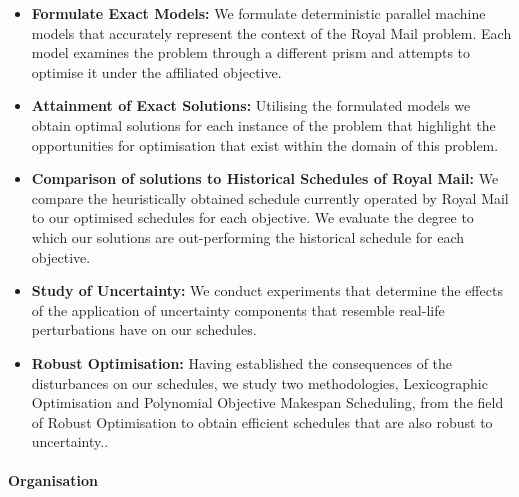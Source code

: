 \vspace{\baselineskip}
\begin{itemize}

	\item \textbf{Formulate Exact Models:} We formulate deterministic parallel machine models that accurately represent the context of the Royal Mail problem. Each model examines the problem through a different prism and attempts to optimise it under the affiliated objective.  \par

	\item \textbf{Attainment of Exact Solutions:} Utilising the formulated models we obtain optimal solutions for each instance of the problem that highlight the opportunities for optimisation that exist within the domain of this problem.   \par
	
	\item \textbf{Comparison of solutions to Historical Schedules of Royal Mail: }We compare the heuristically obtained schedule currently operated by Royal Mail to our optimised schedules for each objective. We evaluate the degree to which our solutions are out-performing the historical schedule for each objective. \par

	\item \textbf{Study of Uncertainty:} We conduct experiments that determine the effects of the application of uncertainty components that resemble real-life perturbations have on our schedules.
	
	\item \textbf{Robust Optimisation:} Having established the consequences of the disturbances on our schedules, we study two methodologies, Lexicographic Optimisation and Polynomial Objective Makespan Scheduling, from the field of Robust Optimisation to obtain efficient schedules that are also robust to uncertainty..
\end{itemize}\par
\vspace{\baselineskip}
\paragraph{Organisation}


